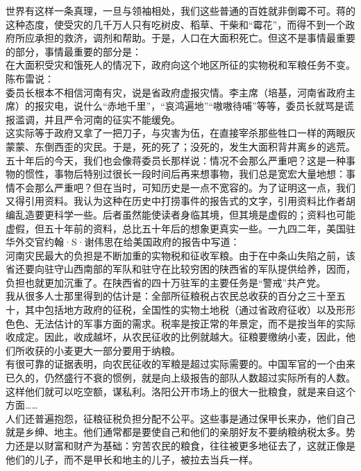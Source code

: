 世界有这样一条真理，一旦与领袖相处，我们这些普通的百姓就非倒霉不可。蒋的这种态度，使受灾的几千万人只有吃树皮、稻草、干柴和“霉花”，而得不到一个政府所应承担的救济，调剂和帮助。于是，人口在大面积死亡。但这不是事情最重要的部分，事情最重要的部分是：\\

在大面积受灾和饿死人的情况下，政府向这个地区所征的实物税和军粮任务不变。\\

陈布雷说：\\

委员长根本不相信河南有灾，说是省政府虚报灾情。李主席（培基，河南省政府主席）的报灾电，说什么“赤地千里”，“哀鸿遍地”“嗷嗷待哺”等等，委员长就骂是谎报滥调，并且严令河南的征实不能缓免。\\

这实际等于政府又拿了一把刀子，与灾害为伍，在直接宰杀那些牲口一样的两眼灰蒙蒙、东倒西歪的灾民。于是，死的死了；没死的，发生大面积背井离乡的逃荒。五十年后的今天，我们也会像蒋委员长那样说：情况不会那么严重吧？这是一种事物的惯性，事物后特别过很长一段时间后再来想事物，我们总是宽宏大量地想：事情不会那么严重吧？但在当时，可知历史是一点不宽容的。为了证明这一点，我们又得引用资料。我认为这种在历史中打捞事件的报告式的文字，引用资料比作者胡编乱造要更科学一些。后者虽然能使读者身临其境，但其境是虚假的；资料也可能虚假，但五十年前的资料，总比五十年后的想象更真实一些。一九四二年，美国驻华外交官约翰·S·谢伟思在给美国政府的报告中写道：\\

河南灾民最大的负担是不断加重的实物税和征收军粮。由于在中条山失陷之前，该省还要向驻守山西南部的军队和驻守在比较穷困的陕西省的军队提供给养，因而，负担也就更加沉重了。在陕西省的四十万驻军的主要任务是“警戒”共产党。\\

我从很多人士那里得到的估计是：全部所征粮税占农民总收获的百分之三十至五十，其中包括地方政府的征税，全国性的实物土地税（通过省政府征收）以及形形色色、无法估计的军事方面的需求。税率是按正常的年景定，而不是按当年的实际收成定。因此，收成越坏，从农民征收的比例就越大。征粮要缴纳小麦，因此，他们所收获的小麦更大一部分要用于纳粮。\\

有很可靠的证据表明，向农民征收的军粮是超过实际需要的。中国军官的一个由来已久的，仍然盛行不衰的惯例，就是向上级报告的部队人数超过实际所有的人数。这样他们就可以吃空额，谋私利。洛阳公开市场上的很大一批粮食，就是来自这个方面……\\

人们还普遍抱怨，征粮征税负担分配不公平。这些事是通过保甲长来办，他们自己就是乡绅、地主。他们通常都是要使自己和他们的亲朋好友不要纳粮纳税太多。势力还是以财富和财产为基础：穷苦农民的粮食，往往被更多地征去了，这就正像是他们的儿子，而不是甲长和地主的儿子，被拉去当兵一样。\\

